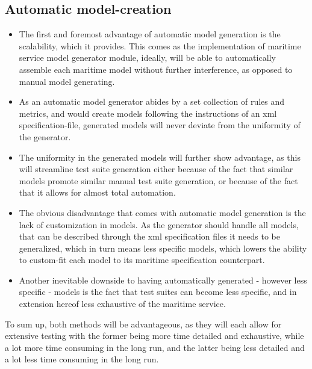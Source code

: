\subsection{Automatic model-creation}
\begin{itemize}
	\item The first and foremost advantage of automatic model generation is the scalability, which it provides. This comes as the implementation of  maritime service model generator module, ideally, will be able to automatically assemble each maritime model without further interference, as opposed to manual model generating.
	\item As an automatic model generator abides by a set collection of rules and metrics, and would create models following the instructions of an xml specification-file, generated models will never deviate from the uniformity of the generator.
	\item The uniformity in the generated models will further show advantage, as this will streamline test suite generation either because of the fact that similar models promote similar manual test suite generation, or because of the fact that it allows for almost total automation.
\end{itemize}
\begin{itemize}
	\item The obvious disadvantage that comes with automatic model generation is the lack of customization in models. As the generator should handle all models, that can be described through the xml specification files it needs to be generalized, which in turn means less specific models, which lowers the ability to custom-fit each model to its maritime specification counterpart.
	\item Another inevitable downside to having automatically generated - however less specific - models is the fact that test suites can become less specific, and in extension hereof less exhaustive of the maritime service.
\end{itemize}

To sum up, both methods will be advantageous, as they will each allow for extensive testing with the former being more time detailed and exhaustive, while a lot more time consuming in the long run, and the latter being less detailed and a lot less time consuming in the long run.